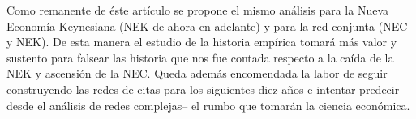 \documentclass[12pt,letter]{article}
\begin{document}
Como remanente de éste artículo se propone el mismo análisis para la Nueva Economía Keynesiana (NEK de ahora en adelante) y para la red conjunta (NEC y NEK). De esta manera el estudio de la historia empírica tomará más valor y sustento para falsear las historia que nos fue contada respecto a la caída de la NEK y ascensión de la NEC. Queda además encomendada la labor de seguir construyendo las redes de citas para los siguientes diez años e intentar predecir --desde el análisis de redes complejas-- el rumbo que tomarán la ciencia económica.

\newpage



\end{document}
